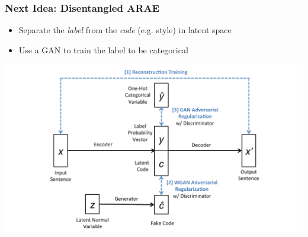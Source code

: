 \documentclass{beamer}
\begin{document}
\begin{frame}
\frametitle{Next Idea: Disentangled ARAE} 
\begin{itemize}
\item Separate the \emph{label} from the \emph{code} (e.g. style) in latent space
\item Use a GAN to train the label to be categorical
\end{itemize}
\begin{center}
\includegraphics[scale=0.15]{our-aae}
\end{center}
\end{frame}
\end{document}
